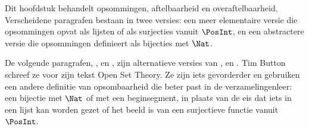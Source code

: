\documentclass[../../../include/open-logic-chapter]{subfiles}
\begin{document}

\begin{editorial}
Dit hoofdstuk behandelt opsommingen, aftelbaarheid en
overaftelbaarheid. Verscheidene paragrafen bestaan in twee versies: een
meer elementaire versie die opsommingen opvat als lijsten of als
surjecties vanuit $\PosInt$, en een abstractere versie die opsommingen
definieert als bijecties met $\Nat$.
\end{editorial}











\begin{editorial}
De volgende paragrafen, ,
 en , zijn
alternatieve versies van ,
 en . Tim Button
schreef ze voor zijn tekst Open Set Theory. Ze zijn iets gevorderder
en gebruiken een andere definitie van opsombaarheid die beter past in
de verzamelingenleer: een bijectie met $\Nat$ of met een beginsegment,
in plaats van de eis dat iets in een lijst kan worden gezet of het
beeld is van een surjectieve functie vanuit $\PosInt$.
\end{editorial}


\OLEndChapterHook
\end{document}

